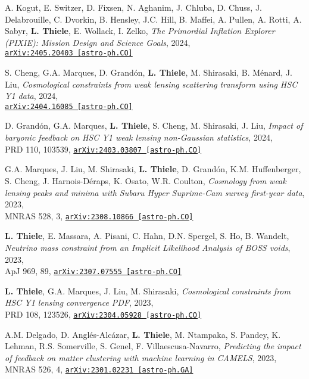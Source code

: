 \newpage
\vspace*{0.5cm}

A. Kogut, E. Switzer, D. Fixsen, N. Aghanim, J. Chluba, D. Chuss, J. Delabrouille,
C. Dvorkin, B. Hensley, J.C. Hill, B. Maffei, A. Pullen, A. Rotti, A. Sabyr,
{\bf L. Thiele}, E. Wollack, I. Zelko,
\emph{The Primordial Inflation Explorer (PIXIE): Mission Design and Science Goals}, 2024,\\
\href{https://arxiv.org/abs/2405.20403}{\mbox{\texttt{arXiv:2405.20403 [astro-ph.CO]}}}

S. Cheng, G.A. Marques, D. Grand\'on, {\bf L. Thiele}, M. Shirasaki, B. M\'enard, J. Liu,
\emph{Cosmological constraints from weak lensing scattering transform using HSC Y1 data}, 2024,\\
\href{https://arxiv.org/abs/2404.16085}{\mbox{\texttt{arXiv:2404.16085 [astro-ph.CO]}}}

D. Grand\'on, G.A. Marques, {\bf L. Thiele}, S. Cheng, M. Shirasaki, J. Liu,
\emph{Impact of baryonic feedback on HSC Y1 weak lensing non-Gaussian statistics}, 2024,\\
PRD 110, 103539,
\href{https://arxiv.org/abs/2403.03807}{\mbox{\texttt{arXiv:2403.03807 [astro-ph.CO]}}}

G.A. Marques, J. Liu, M. Shirasaki, {\bf L. Thiele}, D. Grand\'on, K.M. Huffenberger,
S. Cheng, J. Harnois-D\'eraps, K. Osato, W.R. Coulton,
\emph{Cosmology from weak lensing peaks and minima
      with Subaru Hyper Suprime-Cam survey first-year data}, 2023,\\
MNRAS 528, 3,
\href{https://arxiv.org/abs/2308.10866}{\mbox{\texttt{arXiv:2308.10866 [astro-ph.CO]}}}

{\bf L. Thiele}, E. Massara, A. Pisani, C. Hahn, D.N. Spergel, S. Ho, B. Wandelt,
\emph{Neutrino mass constraint from an Implicit Likelihood Analysis of BOSS voids}, 2023,\\
ApJ 969, 89,
\href{https://arxiv.org/abs/2307.07555}{\mbox{\texttt{arXiv:2307.07555 [astro-ph.CO]}}}

{\bf L. Thiele}, G.A. Marques, J. Liu, M. Shirasaki,
\emph{Cosmological constraints from HSC Y1 lensing convergence PDF}, 2023,\\
PRD 108, 123526,
\href{https://arxiv.org/abs/2304.05928}{\mbox{\texttt{arXiv:2304.05928 [astro-ph.CO]}}}

A.M. Delgado, D. Angl\'es-Alc\'azar, {\bf L. Thiele}, M. Ntampaka, S. Pandey,
K. Lehman, R.S. Somerville, S. Genel, F. Villaescusa-Navarro,
\emph{Predicting the impact of feedback on matter clustering with machine learning
      in CAMELS}, 2023,\\
MNRAS 526, 4,
\href{https://arxiv.org/abs/2301.02231}{\mbox{\texttt{arXiv:2301.02231 [astro-ph.GA]}}}

